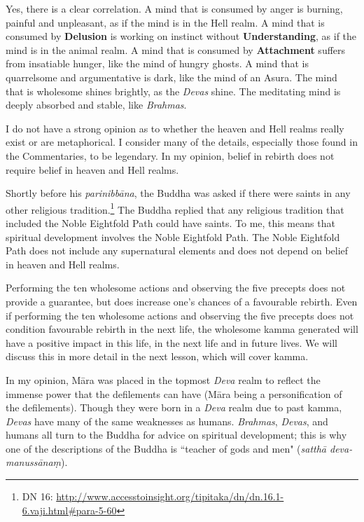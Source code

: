 Yes, there is a clear correlation. A mind that is consumed by anger is burning, painful and unpleasant, as if the mind is in the Hell realm. A mind that is consumed by \textbf{Delusion} is working on instinct without \textbf{Understanding}, as if the mind is in the animal realm. A mind that is consumed by \textbf{Attachment} suffers from insatiable hunger, like the mind of hungry ghosts. A mind that is quarrelsome and argumentative is dark, like the mind of an Asura. The mind that is wholesome shines brightly, as the \textit{Devas} shine. The meditating mind is deeply absorbed and stable, like \textit{Brahmas}.


I do not have a strong opinion as to whether the heaven and Hell realms really exist or are metaphorical. I consider many of the details, especially those found in the Commentaries, to be legendary. In my opinion, belief in rebirth does not require belief in heaven and Hell realms.

Shortly before his \textit{parinibbāna}, the Buddha was asked if there were saints in any other religious tradition.\footnote{DN 16: \url{http://www.accesstoinsight.org/tipitaka/dn/dn.16.1-6.vaji.html\#para-5-60}} The Buddha replied that any religious tradition that included the Noble Eightfold Path could have saints. To me, this means that spiritual development involves the Noble Eightfold Path. The Noble Eightfold Path does not include any supernatural elements and does not depend on belief in heaven and Hell realms.


Performing the ten wholesome actions and observing the five precepts does not provide a guarantee, but does increase one’s chances of a favourable rebirth. Even if performing the ten wholesome actions and observing the five precepts does not condition favourable rebirth in the next life, the wholesome kamma generated will have a positive impact in this life, in the next life and in future lives. We will discuss this in more detail in the next lesson, which will cover kamma.


In my opinion, Māra was placed in the topmost \textit{Deva} realm to reflect the immense power that the defilements can have (Māra being a personification of the defilements). Though they were born in a \textit{Deva} realm due to past kamma, \textit{Devas} have many of the same weaknesses as humans. \textit{Brahmas}, \textit{Devas}, and humans all turn to the Buddha for advice on spiritual development; this is why one of the descriptions of the Buddha is ``teacher of gods and men" (\textit{satthā deva-manussānaṃ}). 

